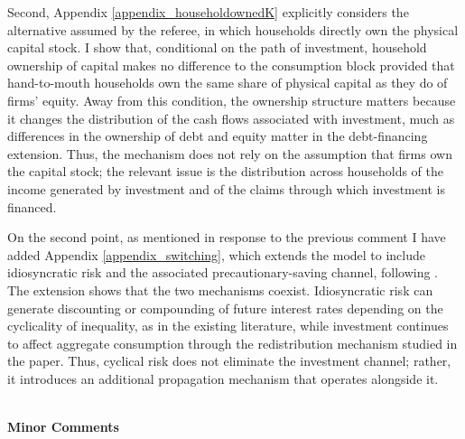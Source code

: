 \documentclass[11pt]{article}
\begin{document}
\begin{enumerate} [  1.]
Second, Appendix \ref{appendix_householdownedK} explicitly considers the alternative assumed by the referee, in which households directly own the physical capital stock. I show that, conditional on the path of investment, household ownership of capital makes no difference to the consumption block provided that hand-to-mouth households own the same share of physical capital as they do of firms' equity. Away from this condition, the ownership structure matters because it changes the distribution of the cash flows associated with investment, much as differences in the ownership of debt and equity matter in the debt-financing extension. Thus, the mechanism does not rely on the assumption that firms own the capital stock; the relevant issue is the distribution across households of the income generated by investment and of the claims through which investment is financed.

On the second point, as mentioned in response to the previous comment I have added Appendix \ref{appendix_switching}, which extends the model to include idiosyncratic risk and the associated precautionary-saving channel, following \cite{Bilbiie2021}. The extension shows that the two mechanisms coexist. Idiosyncratic risk can generate discounting or compounding of future interest rates depending on the cyclicality of inequality, as in the existing literature, while investment continues to affect aggregate consumption through the redistribution mechanism studied in the paper. Thus, cyclical risk does not eliminate the investment channel; rather, it introduces an additional propagation mechanism that operates alongside it.

\end{enumerate}

~\\

\noindent \textbf{Minor Comments}\\
\end{document}
